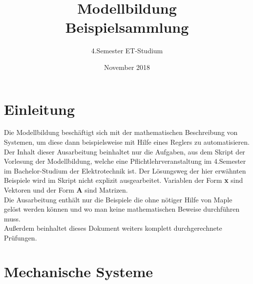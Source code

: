\documentclass[a4paper,12p]{article}
\title{\huge Modellbildung\\\large \huge Beispielsammlung}
\author{\huge 4.Semester ET-Studium}
\date{\huge November 2018}
\begin{document}
	
\maketitle
\newpage
\tableofcontents
\newpage
\section{Einleitung}
Die Modellbildung beschäftigt sich mit der mathematischen Beschreibung von Systemen, um diese dann beispielsweise mit Hilfe eines Reglers zu automatisieren.
\newline
Der Inhalt dieser Ausarbeitung beinhaltet nur die Aufgaben, aus dem Skript der Vorlesung der Modellbildung, welche eine Pflichtlehrveranstaltung im 4.Semester im Bachelor-Studium der Elektrotechnik ist. Der Lösungsweg der hier erwähnten Beispiele wird im Skript nicht explizit ausgearbeitet. Variablen der Form \textbf{x} sind Vektoren und der Form \textbf{A} sind Matrizen. \\
Die Ausarbeitung enthält nur die Beispiele die ohne nötiger Hilfe von Maple gelöst werden können und wo man keine mathematischen Beweise durchführen muss. \\
Außerdem beinhaltet dieses Dokument weiters komplett durchgerechnete Prüfungen.
\section{Mechanische Systeme}
\end{document}
